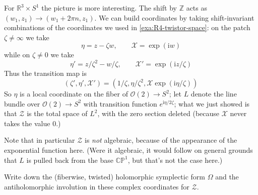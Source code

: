 \documentclass[12pt,letterpaper,reqno]{article}
\numberwithin{equation}{section}
\newcommand{\cZ}{\ensuremath{\mathcal Z}}
\newcommand{\cO}{\ensuremath{\mathcal O}}
\newcommand{\cX}{\ensuremath{\mathcal X}}
\newcommand{\R}{\ensuremath{\mathbb R}}
\newcommand{\C}{\ensuremath{\mathbb C}}
\newcommand{\PP}{\ensuremath{\mathbb P}}
\newcommand{\Z}{\ensuremath{\mathbb Z}}
\newcommand{\I}{{\mathrm i}}
\newcommand{\ti}[1]{\textit{#1}}
\newcommand{\fixme}[1]{{\color{orange}{[#1]}}}
\begin{document}
\begin{example}[Twistor space of $\R^3 \times S^1$]  \label{exa:R3S1-twistor-space}
For $\R^3 \times S^1$ the picture is more interesting.
The shift by $\Z$ acts as $(w_1,z_1) \to (w_1 + 2 \pi n, z_1)$.
We can build coordinates by taking shift-invariant 
combinations of the coordinates we used in 
\autoref{exa:R4-twistor-space}:
on the patch $\zeta \neq \infty$ we take
\begin{equation}
 \eta = z - \zeta w, \qquad \cX = \exp(\I w)
\end{equation}
while on $\zeta \neq 0$ we take
\begin{equation}
 \eta' = z / \zeta^2 - w / \zeta, \qquad \cX' = \exp(\I z / \zeta)
\end{equation}
Thus the transition map is
\begin{equation}
  (\zeta', \eta', \cX') = (1 / \zeta, \eta / \zeta^2, \cX \exp(\I \eta / \zeta) )
\end{equation}
So $\eta$ is a local coordinate on the fiber of $\cO(2) \to S^2$;
let $L$ denote the line bundle over $\cO(2) \to S^2$ with 
transition function $e^{\I \eta / 2 \zeta}$; what we just showed
is that $\cZ$ is the total space of $L^2$, with the
zero section deleted (because $\cX$ never takes the value $0$.)

Note that in particular $\cZ$ is \ti{not} algebraic, because of the
appearance of the exponential function here. (Were it algebraic,
it would follow on general grounds that $L$ is pulled back from 
the base $\C\PP^1$, but that's not the case here.)
\end{example}

\begin{exercise} Write down the (fiberwise, twisted) holomorphic symplectic form 
$\Omega$ and the antiholomorphic involution in these complex 
coordinates for $\cZ$.
\end{exercise}


\end{document}
